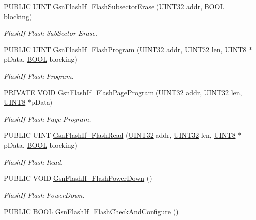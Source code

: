 \begin{DoxyCompactItemize}
PUBLIC UINT \hyperlink{a00647_gaba565cfc9046eef09ab9934e687f6044}{GsnFlashIf\_\-FlashSubsectorErase} (\hyperlink{a00660_gae1e6edbbc26d6fbc71a90190d0266018}{UINT32} addr, \hyperlink{a00660_ga1f04022c0a182c51c059438790ea138c}{BOOL} blocking)
\begin{DoxyCompactList}\small\item\em FlashIf Flash SubSector Erase. \end{DoxyCompactList}\item 
PUBLIC UINT \hyperlink{a00647_ga3998be9c292aba1e22142a3987b5f5c8}{GsnFlashIf\_\-FlashProgram} (\hyperlink{a00660_gae1e6edbbc26d6fbc71a90190d0266018}{UINT32} addr, \hyperlink{a00660_gae1e6edbbc26d6fbc71a90190d0266018}{UINT32} len, \hyperlink{a00660_gab27e9918b538ce9d8ca692479b375b6a}{UINT8} $\ast$pData, \hyperlink{a00660_ga1f04022c0a182c51c059438790ea138c}{BOOL} blocking)
\begin{DoxyCompactList}\small\item\em FlashIf Flash Program. \end{DoxyCompactList}\item 
PRIVATE VOID \hyperlink{a00647_ga0df0295551b38ea8a75b6bbfa748cde4}{GsnFlashIf\_\-FlashPageProgram} (\hyperlink{a00660_gae1e6edbbc26d6fbc71a90190d0266018}{UINT32} addr, \hyperlink{a00660_gae1e6edbbc26d6fbc71a90190d0266018}{UINT32} len, \hyperlink{a00660_gab27e9918b538ce9d8ca692479b375b6a}{UINT8} $\ast$pData)
\begin{DoxyCompactList}\small\item\em FlashIf Flash Page Program. \end{DoxyCompactList}\item 
PUBLIC UINT \hyperlink{a00647_ga3ed4044178d723647df832021c3a609d}{GsnFlashIf\_\-FlashRead} (\hyperlink{a00660_gae1e6edbbc26d6fbc71a90190d0266018}{UINT32} addr, \hyperlink{a00660_gae1e6edbbc26d6fbc71a90190d0266018}{UINT32} len, \hyperlink{a00660_gab27e9918b538ce9d8ca692479b375b6a}{UINT8} $\ast$pData, \hyperlink{a00660_ga1f04022c0a182c51c059438790ea138c}{BOOL} blocking)
\begin{DoxyCompactList}\small\item\em FlashIf Flash Read. \end{DoxyCompactList}\item 
PUBLIC VOID \hyperlink{a00647_ga0fdd893814aead99338aea969b2cfc0a}{GsnFlashIf\_\-FlashPowerDown} ()
\begin{DoxyCompactList}\small\item\em FlashIf Flash PowerDown. \end{DoxyCompactList}\item 
PUBLIC \hyperlink{a00660_ga1f04022c0a182c51c059438790ea138c}{BOOL} \hyperlink{a00501_aa37d5775a1265f01dfeb546ec298075b}{GsnFlashIf\_\-FlashCheckAndConfigure} ()
\end{DoxyCompactItemize}


